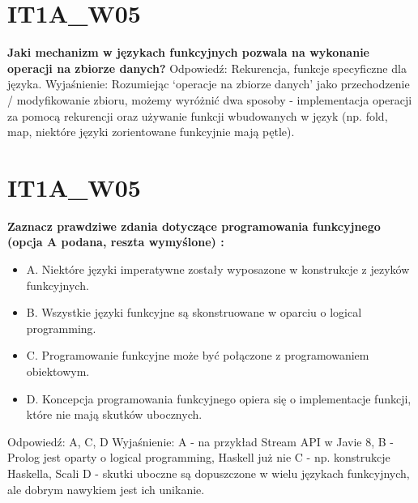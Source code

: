 \section{IT1A\_W05} 
\textbf{Jaki mechanizm w językach funkcyjnych pozwala na wykonanie operacji na zbiorze danych?} \newline
Odpowiedź: Rekurencja, funkcje specyficzne dla języka.\newline
Wyjaśnienie:\newline
Rozumiejąc ‘operacje na zbiorze danych’ jako przechodzenie / modyfikowanie zbioru, możemy wyróżnić dwa sposoby - implementacja operacji za pomocą rekurencji oraz używanie funkcji wbudowanych w język (np. fold, map, niektóre języki zorientowane funkcyjnie mają pętle).

\section{IT1A\_W05} 
\textbf{Zaznacz prawdziwe zdania dotyczące programowania funkcyjnego (opcja A podana, reszta wymyślone) :}
\begin{itemize}
\item A. Niektóre języki imperatywne zostały wyposazone w konstrukcje z jezyków funkcyjnych.
\item B. Wszystkie języki funkcyjne są skonstruowane w oparciu o logical programming.
\item C. Programowanie funkcyjne może być połączone z programowaniem obiektowym.
\item D. Koncepcja programowania funkcyjnego opiera się o implementacje funkcji, które nie mają skutków ubocznych.
\end{itemize}

Odpowiedź: A, C, D \newline
Wyjaśnienie:
A - na przykład Stream API w Javie 8,
B - Prolog jest oparty o logical programming, Haskell już nie
C - np. konstrukcje Haskella, Scali
D - skutki uboczne są dopuszczone w wielu językach funkcyjnych, ale dobrym nawykiem jest ich unikanie.

